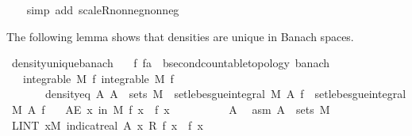 \begin{isabellebody}
\ \ \isamarkupfalse%
\ {\isacharparenleft}{\kern0pt}simp\ add{\isacharcolon}{\kern0pt}\ scaleR{\isacharunderscore}{\kern0pt}nonneg{\isacharunderscore}{\kern0pt}nonneg{\isacharparenright}{\kern0pt}%
\endisatagproof
{\isafoldproof}%
%
\isadelimproof
%
\endisadelimproof
%
\begin{isamarkuptext}%
The following lemma shows that densities are unique in Banach spaces.%
\end{isamarkuptext}\isamarkuptrue%
\isamarkupfalse%
\ density{\isacharunderscore}{\kern0pt}unique{\isacharunderscore}{\kern0pt}banach{\isacharcolon}{\kern0pt}\isanewline
\ \ \ f\ f{\isacharprime}{\kern0pt}{\isacharcolon}{\kern0pt}{\isacharcolon}{\kern0pt}{\isachardoublequoteopen}{\isacharprime}{\kern0pt}a\ {\isasymRightarrow}\ {\isacharprime}{\kern0pt}b{\isacharcolon}{\kern0pt}{\isacharcolon}{\kern0pt}{\isacharbraceleft}{\kern0pt}second{\isacharunderscore}{\kern0pt}countable{\isacharunderscore}{\kern0pt}topology{\isacharcomma}{\kern0pt}\ banach{\isacharbraceright}{\kern0pt}{\isachardoublequoteclose}\isanewline
\ \ \ {\isachardoublequoteopen}integrable\ M\ f{\isachardoublequoteclose}\ {\isachardoublequoteopen}integrable\ M\ f{\isacharprime}{\kern0pt}{\isachardoublequoteclose}\isanewline
\ \ \ \ \ \ \ density{\isacharunderscore}{\kern0pt}eq{\isacharcolon}{\kern0pt}\ {\isachardoublequoteopen}{\isasymAnd}A{\isachardot}{\kern0pt}\ A\ {\isasymin}\ sets\ M\ {\isasymLongrightarrow}\ set{\isacharunderscore}{\kern0pt}lebesgue{\isacharunderscore}{\kern0pt}integral\ M\ A\ f\ {\isacharequal}{\kern0pt}\ set{\isacharunderscore}{\kern0pt}lebesgue{\isacharunderscore}{\kern0pt}integral\ M\ A\ f{\isacharprime}{\kern0pt}{\isachardoublequoteclose}\isanewline
\ \ \ {\isachardoublequoteopen}AE\ x\ in\ M{\isachardot}{\kern0pt}\ f\ x\ {\isacharequal}{\kern0pt}\ f{\isacharprime}{\kern0pt}\ x{\isachardoublequoteclose}\isanewline
%
\isadelimproof
%
\endisadelimproof
%
\isatagproof
{}\isamarkupfalse%
{\isacharminus}{\kern0pt}\isanewline
\ \ \isacommand{{\isacharbraceleft}{\kern0pt}}\isamarkupfalse%
\ \isanewline
\ \ \ \ \isamarkupfalse%
\ A\ \isamarkupfalse%
\ asm{\isacharcolon}{\kern0pt}\ {\isachardoublequoteopen}A\ {\isasymin}\ sets\ M{\isachardoublequoteclose}\isanewline
\ \ \ \ \isamarkupfalse%
\ {\isachardoublequoteopen}LINT\ x{\isacharbar}{\kern0pt}M{\isachardot}{\kern0pt}\ indicat{\isacharunderscore}{\kern0pt}real\ A\ x\ {\isacharasterisk}{\kern0pt}\isactrlsub R\ {\isacharparenleft}{\kern0pt}f\ x\ {\isacharminus}{\kern0pt}\ f{\isacharprime}{\kern0pt}\ x{\isacharparenright}{\kern0pt}\ {\isacharequal}{\kern0pt}\ {}{\isachardoublequoteclose}\ \isamarkupfalse%

\end{isabellebody}
